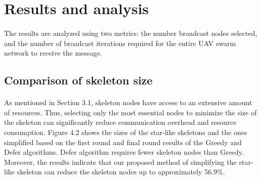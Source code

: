 \documentclass[a4paper,12pt]{report}
\begin{document}
\section{Results and analysis}
\paragraph{}
The results are analyzed using two metrics: the number broadcast nodes selected, and the number of broadcast iterations required for the entire UAV swarm network to receive the message.

\subsection{Comparison of skeleton size}

\paragraph{}
As mentioned in Section 3.1, skeleton nodes have access to an extensive amount of resources. Thus, selecting only the most essential nodes to minimize the size of the skeleton can significantly reduce communication overhead and resource consumption. Figure 4.2 shows the sizes of the star-like skeletons and the ones simplified based on the first round and final round results of the Greedy and Defer algorithms. Defer algorithm requires fewer skeleton nodes than Greedy. Moreover, the results indicate that our proposed method of simplifying the star-like skeleton can reduce the skeleton nodes up to approximately 56.9\%.
\end{document}
